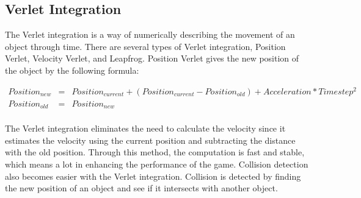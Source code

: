 \subsection{Verlet Integration}
The Verlet integration is a way of numerically describing  the movement of an object through
time\cite{website:Bitterli09}. There are several types of Verlet integration,
Position Verlet, Velocity 
Verlet, and Leapfrog. Position Verlet gives the new position of the object by the following 
formula:

\begin{eqnarray}
Position_{new}  & = &
Position_{current} + 
(Position_{current} - Position_{old}) +
Acceleration * Timestep^2 \nonumber \\
Position_{old} & = & Position_{new} \nonumber \\
\label{Verlet}
\end{eqnarray}

The Verlet integration eliminates the need to calculate the velocity since it estimates 
the velocity using the current position and subtracting the distance with the old position. 
Through this method, the computation is fast and stable, which means a lot in enhancing the
performance of the game. Collision detection also becomes easier with the Verlet integration.
Collision is detected by finding the new position of an object and see if it intersects with
another object.


